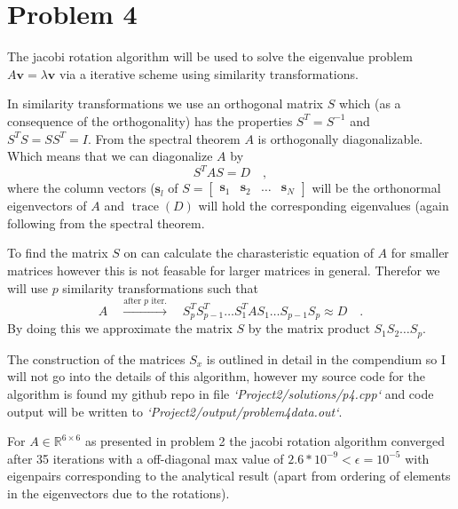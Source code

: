 \documentclass[final, 3p, times, 11.5pt]{article}
\begin{document}
\section{Problem 4}

The jacobi rotation algorithm will be used to solve the eigenvalue problem $A\mathbf{v}=\lambda \mathbf{v}$ via a iterative scheme using similarity transformations. 

In similarity transformations we use an orthogonal matrix $S$ which (as a consequence of the orthogonality) has the properties $S^T = S^{-1}$ and $S^T S = S S^T = I$. From the spectral theorem \cite[see theorem 3 chapter 7.1 of ][for detail]{Linear_Algebra_and_its_Applications} $A$ is orthogonally diagonalizable. Which means that we can diagonalize $A$ by 
$$S^TAS=D \quad,$$
where the column vectors ($\mathbf{s}_l$ of $S = \begin{bmatrix} \mathbf{s}_1 & \mathbf{s}_2 & \dots & \mathbf{s}_N\end{bmatrix}$ will be the orthonormal eigenvectors of $A$ and $\operatorname{trace}(D)$ will hold the corresponding eigenvalues (again following from the spectral theorem. 

To find the matrix $S$ on can calculate the charasteristic equation of $A$ for smaller matrices however this is not feasable for larger matrices in general. Therefor we will use $p$ similarity transformations such that
$$
A \quad \stackrel{\text{after $p$ iter.}}{\to} \quad  
S_p^T S_{p-1}^T \dots S_1^T A S_1 \dots S_{p-1}S_p \approx D \quad.
$$
By doing this we approximate the matrix $S$ by the matrix product $S_1 S_2 \dots S_p$.

The construction of the matrices $S_x$ is outlined in detail in the compendium so I will not go into the details of this algorithm, however my source code for the algorithm is found my github repo in file \textit{`Project2/solutions/p4.cpp`} and code output will be written to \textit{`Project2/output/problem4data.out`}. 

For $A \in \mathbb{R}^{6 \times 6}$ as presented in problem 2 the jacobi rotation algorithm converged after 35 iterations with a off-diagonal max value of $2.6*10^{-9} < \epsilon = 10^{-5}$ with eigenpairs corresponding to the analytical result (apart from ordering of elements in the eigenvectors due to the rotations).
\end{document}
